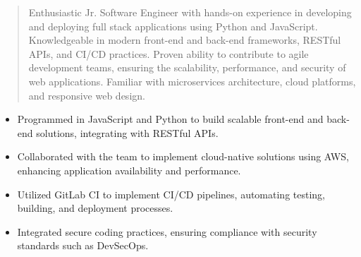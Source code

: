 



\makecvheader

\begin{quote}
  \noindent
  Enthusiastic Jr. Software Engineer with hands-on experience in developing and deploying full stack applications using Python and JavaScript. Knowledgeable in modern front-end and back-end frameworks, RESTful APIs, and CI/CD practices. Proven ability to contribute to agile development teams, ensuring the scalability, performance, and security of web applications. Familiar with microservices architecture, cloud platforms, and responsive web design.
\end{quote}

\par\smallskip
\noindent
\begin{minipage}{20cm}
  \begin{minipage}{9.75cm}
    \begin{itemize}
      \item Programmed in JavaScript and Python to build scalable front-end and back-end solutions, integrating with RESTful APIs.
      \item Collaborated with the team to implement cloud-native solutions using AWS, enhancing application availability and performance.
    \end{itemize}
  \end{minipage}
  \hfill
  \begin{minipage}{9.75cm}
    \begin{itemize}
      \item Utilized GitLab CI to implement CI/CD pipelines, automating testing, building, and deployment processes.
      \item Integrated secure coding practices, ensuring compliance with security standards such as DevSecOps.
    \end{itemize}
  \end{minipage}
\end{minipage}
\par\smallskip
\divider


